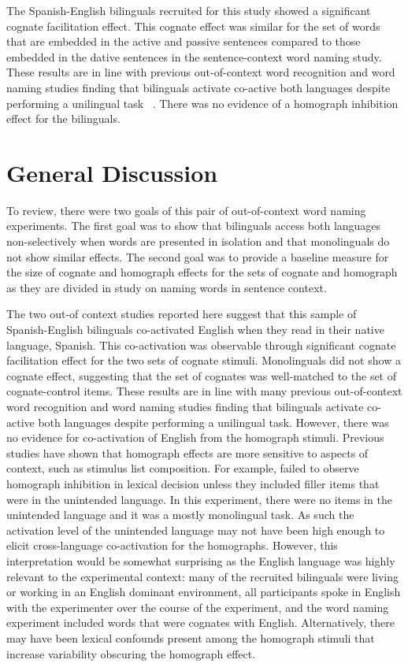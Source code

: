 The Spanish-English bilinguals recruited for this study showed a significant cognate facilitation effect. This cognate effect was similar for the set of words that are embedded in the active and passive sentences compared to those embedded in the dative sentences in the sentence-context word naming study. These results are in line with previous out-of-context word recognition and word naming studies finding that bilinguals activate co-active both languages despite performing a unilingual task ~\citep[e.g.,][]{Dijkstra1998,Schwartz2007}. There was no evidence of a homograph inhibition effect for the bilinguals. 

\section{General Discussion}
\label{generaldiscussion}

To review, there were two goals of this pair of out-of-context word naming experiments. The first goal was to show that bilinguals access both languages non-selectively when words are presented in isolation and that monolinguals do not show similar effects. The second goal was to provide a baseline measure for the size of cognate and homograph effects for the sets of cognate and homograph as they are divided in study on naming words in sentence context. 

The two out-of context studies reported here suggest that this sample of\\ Spanish-English bilinguals co-activated English when they read in their native language, Spanish. This co-activation was observable through significant cognate facilitation effect for the two sets of cognate stimuli. Monolinguals did not show a cognate effect, suggesting that the set of cognates was well-matched to the set of cognate-control items. These results are in line with many previous out-of-context word recognition and word naming studies finding that bilinguals activate co-active both languages despite performing a unilingual task. However, there was no evidence for co-activation of English from the homograph stimuli. Previous studies have shown that homograph effects are more sensitive to aspects of context, such as stimulus list composition. For example,  \citet{Dijkstra1998} failed to observe homograph inhibition in lexical decision unless they included filler items that were in the unintended language. In this experiment, there were no items in the unintended language and it was a mostly monolingual task. As such the activation level of the unintended language may not have been high enough to elicit cross-language co-activation for the homographs. However, this interpretation would be somewhat surprising as the English language was highly relevant to the experimental context: many of the recruited bilinguals were living or working in an English dominant environment, all participants spoke in English with the experimenter over the course of the experiment, and the word naming experiment included words that were cognates with English. Alternatively, there may have been lexical confounds present among the homograph stimuli that increase variability obscuring the homograph effect. 

